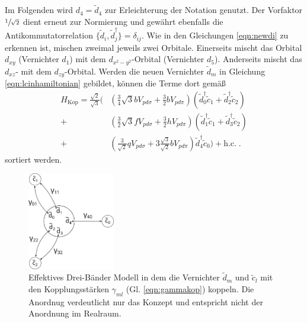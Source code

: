 Im Folgenden wird $d_4 = \tilde{d}_4$ zur Erleichterung der Notation genutzt.
Der Vorfaktor $\sfrac{1}{\sqrt{2}}$ dient erneut zur Normierung und gewährt ebenfalls die Antikommutatorrelation $\{ \tilde{d}_i, \tilde{d}^\dagger_j \} = \delta_{ij}$.
Wie in den Gleichungen \eqref{eqn:newdi} zu erkennen ist, mischen zweimal jeweils zwei Orbitale.
Einerseits mischt das Orbital $d_{xy}$ (Vernichter $d_1$) mit dem $d_{x^2-y^2}$-Orbital (Vernichter $d_5$).
Anderseits mischt das $d_{xz}$- mit dem $d_{zy}$-Orbital.
Werden die neuen Vernichter $\tilde{d}_m$ in Gleichung \eqref{eqn:lcinhamiltonian} gebildet, können die Terme dort gemäß
\begin{equation}
            \begin{split}
                H_\text{Kop} = \frac{\sqrt{2}}{\sqrt{3}}  \biggl(
                & \left ( \frac{3}{4}\sqrt{3} b V_{pd\sigma} + \frac{3}{2}  b   V_{pd\pi} \right )      \left ( \tilde{d}^\dagger_0 \tilde{c}_1 + \tilde{d}^\dagger_2 \tilde{c}_2 \right )   \\
            +    & \left ( \frac{3}{2}\sqrt{3} f V_{pd\sigma} + \frac{3}{2}  h   V_{pd\pi} \right )     \left ( \tilde{d}^\dagger_1 \tilde{c}_1 + \tilde{d}^\dagger_3 \tilde{c}_2 \right )   \\
            +    & \left ( \frac{3}{\sqrt{2}} q V_{pd\sigma} + 3 \frac{\sqrt{3}}{\sqrt{2}}  b V_{pd\pi} \right ) \tilde{d}^\dagger_4 \tilde{c}_0 \biggr) + \text{h.c.} \; .
            \end{split}
            \label{eqn:Hkopnice}
\end{equation}
sortiert werden.
\begin{figure}
    \centering
    \includegraphics[width = 0.34\textwidth]{Plots/3band.pdf}
    \caption{Effektives Drei-Bänder Modell in dem die
    Vernichter $\tilde{d}_m$ und $\tilde{c}_l$ mit den Kopplungsstärken
    $\gamma_{ml}$ (Gl. \eqref{eqn:gammakop}) koppeln.
    Die Anordnug verdeutlicht nur das Konzept und entspricht nicht der 
    Anordnung im Realraum.}
    \label{fig:3band}
\end{figure}
